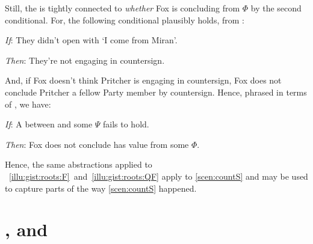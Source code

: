 \begin{note}
  Still, the \ros{} is tightly connected to \emph{whether} Fox is concluding  from \(\Phi\) by the second conditional.
  For, the following conditional plausibly holds, from :
  \begin{itenum}
  \item[\emph{If}:]
    They didn't open with `I come from Miran'.
  \item[\emph{Then}:]
    They're not engaging in countersign.
  \end{itenum}
  And, if Fox doesn't think Pritcher is engaging in countersign, Fox does not conclude Pritcher a fellow Party member by countersign.
  Hence, phrased in terms of , we have:
  \begin{itenum}
  \item[\emph{If}:]
    A \ros{} between  and some \pool{} \(\Psi\) fails to hold.
  \item[\emph{Then}:]
    Fox does not conclude \propI{\signConA{}} has value  from some \pool{} \(\Phi\).
  \end{itenum}
  Hence, the same abstractions applied to ~\ref{illu:gist:roots:F}~and~\ref{illu:gist:roots:QF} apply to \autoref{scen:countS} and may be used to capture parts of the way \autoref{scen:countS} happened.
\end{note}



\section*{\qWhy{}, \qHow{} and \issueInclusion{}}
\label{cha:intro:why-how}



